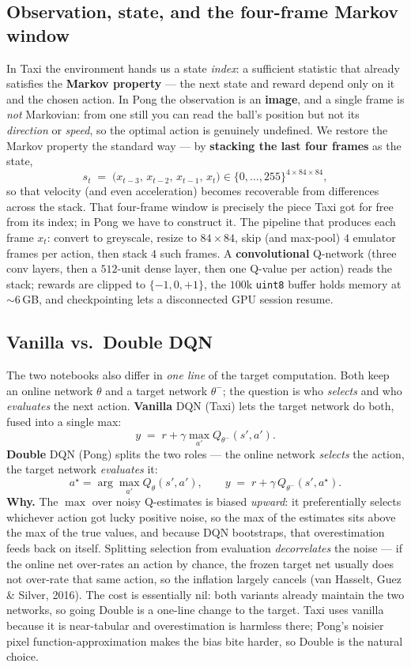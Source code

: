 \documentclass[11pt]{article}
\begin{document}
\subsection{Observation, state, and the four-frame Markov window}
In Taxi the environment hands us a state \emph{index}: a sufficient statistic that already satisfies
the \textbf{Markov property} --- the next state and reward depend only on it and the chosen action. In
Pong the observation is an \textbf{image}, and a single frame is \emph{not} Markovian: from one still
you can read the ball's position but not its \emph{direction} or \emph{speed}, so the optimal action is
genuinely undefined. We restore the Markov property the standard way --- by \textbf{stacking the last
four frames} as the state,
\[
  s_t \;=\; \big(x_{t-3},\,x_{t-2},\,x_{t-1},\,x_t\big)\in\{0,\dots,255\}^{4\times84\times84},
\]
so that velocity (and even acceleration) becomes recoverable from differences across the stack. That
four-frame window is precisely the piece Taxi got for free from its index; in Pong we have to construct
it. The pipeline that produces each frame $x_t$: convert to greyscale, resize to $84\times84$, skip
(and max-pool) $4$ emulator frames per action, then stack $4$ such frames. A \textbf{convolutional}
Q-network (three conv layers, then a $512$-unit dense layer, then one Q-value per action) reads the
stack; rewards are clipped to $\{-1,0,+1\}$, the $100$k \texttt{uint8} buffer holds memory at
${\sim}6$\,GB, and checkpointing lets a disconnected GPU session resume.

\subsection{Vanilla vs.\ Double DQN}
The two notebooks also differ in \emph{one line} of the target computation. Both keep an online
network $\theta$ and a target network $\theta^-$; the question is who \emph{selects} and who
\emph{evaluates} the next action. \textbf{Vanilla} DQN (Taxi) lets the target network do both,
fused into a single max:
\[
  y \;=\; r + \gamma \max_{a'} Q_{\theta^-}(s', a') .
\]
\textbf{Double} DQN (Pong) splits the two roles --- the online network \emph{selects} the action,
the target network \emph{evaluates} it:
\[
  a^\star = \arg\max_{a'} Q_{\theta}(s', a'),
  \qquad
  y \;=\; r + \gamma\, Q_{\theta^-}(s', a^\star) .
\]
\noindent\textbf{Why.} The $\max$ over noisy Q-estimates is biased \emph{upward}: it preferentially
selects whichever action got lucky positive noise, so the max of the estimates sits above the max
of the true values, and because DQN bootstraps, that overestimation feeds back on itself. Splitting
selection from evaluation \emph{decorrelates} the noise --- if the online net over-rates an action
by chance, the frozen target net usually does not over-rate that same action, so the inflation
largely cancels (van Hasselt, Guez \& Silver, 2016). The cost is essentially nil: both variants
already maintain the two networks, so going Double is a one-line change to the target. Taxi uses
vanilla because it is near-tabular and overestimation is harmless there; Pong's noisier pixel
function-approximation makes the bias bite harder, so Double is the natural choice.
\end{document}
